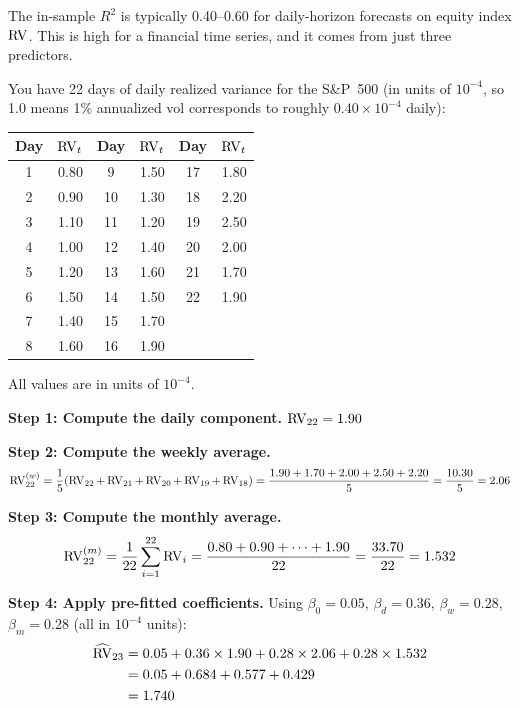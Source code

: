 The in-sample $R^2$ is typically 0.40--0.60 for daily-horizon forecasts on equity index $\operatorname{RV}$.
This is high for a financial time series, and it comes from just three predictors.

\begin{workedexample}
You have 22 days of daily realized variance for the S\&P~500 (in units of $10^{-4}$, so 1.0 means 1\% annualized vol corresponds to roughly $0.40 \times 10^{-4}$ daily):

\medskip
\begin{center}
\begin{tabular}{@{} c r c r c r @{}}
\toprule
\textbf{Day} & \textbf{$\operatorname{RV}_t$} & \textbf{Day} & \textbf{$\operatorname{RV}_t$} & \textbf{Day} & \textbf{$\operatorname{RV}_t$} \\
\midrule
1  & 0.80 & 9  & 1.50 & 17 & 1.80 \\
2  & 0.90 & 10 & 1.30 & 18 & 2.20 \\
3  & 1.10 & 11 & 1.20 & 19 & 2.50 \\
4  & 1.00 & 12 & 1.40 & 20 & 2.00 \\
5  & 1.20 & 13 & 1.60 & 21 & 1.70 \\
6  & 1.50 & 14 & 1.50 & 22 & 1.90 \\
7  & 1.40 & 15 & 1.70 & & \\
8  & 1.60 & 16 & 1.90 & & \\
\bottomrule
\end{tabular}
\end{center}
\medskip

All values are in units of $10^{-4}$.

\textbf{Step 1: Compute the daily component.}
$\operatorname{RV}_{22} = 1.90$

\textbf{Step 2: Compute the weekly average.}
\[
  \operatorname{RV}^{(w)}_{22} = \frac{1}{5}(\operatorname{RV}_{22} + \operatorname{RV}_{21} + \operatorname{RV}_{20} + \operatorname{RV}_{19} + \operatorname{RV}_{18})
  = \frac{1.90 + 1.70 + 2.00 + 2.50 + 2.20}{5} = \frac{10.30}{5} = 2.06
\]

\textbf{Step 3: Compute the monthly average.}
\[
  \operatorname{RV}^{(m)}_{22} = \frac{1}{22}\sum_{i=1}^{22} \operatorname{RV}_i
  = \frac{0.80 + 0.90 + \cdots + 1.90}{22} = \frac{33.70}{22} = 1.532
\]

\textbf{Step 4: Apply pre-fitted coefficients.}
Using $\beta_0 = 0.05$, $\beta_d = 0.36$, $\beta_w = 0.28$, $\beta_m = 0.28$ (all in $10^{-4}$ units):
\begin{align*}
  \widehat{\operatorname{RV}}_{23} &= 0.05 + 0.36 \times 1.90 + 0.28 \times 2.06 + 0.28 \times 1.532 \\
                      &= 0.05 + 0.684 + 0.577 + 0.429 \\
                      &= 1.740
\end{align*}


\end{workedexample}
